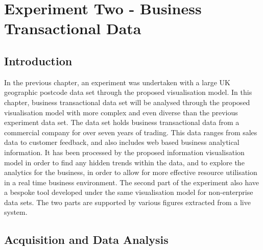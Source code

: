 
\chapter{Experiment Two - Business Transactional Data} %

\label{Chapter6} %



\section{Introduction}

In the previous chapter, an experiment was undertaken with a large UK geographic postcode data set through the proposed visualisation model. In this chapter, business transactional data set will be analysed through the proposed visualisation model with more complex and even diverse than the previous experiment data set. The data set holds business transactional data from a commercial company for over seven years of trading. This data ranges from sales data to customer feedback, and also includes web based business analytical information. It has been processed by the proposed information visualisation model in order to find any hidden trends within the data, and to explore the analytics for the business, in order to allow for more effective resource utilisation in a real time business environment. The second part of the experiment also have a bespoke tool developed under the same visualisation model for non-enterprise data sets. The two parts are supported by various figures extracted from a live system. 

\section{Acquisition and Data Analysis}

